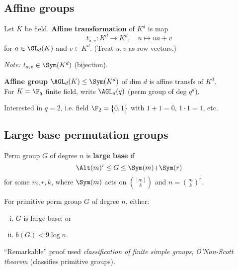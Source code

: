 \subsection{Affine groups}

\begin{slide}
    \begin{definition}
        \vspace{0pt}
        Let $K$ be field. \textbf{Affine transformation} of $K^d$ is map
        $$t_{a,v} : K^d \to K^d, \quad u \mapsto ua + v$$
        for $a \in \GL_d(K)$ and $v \in K^d$. (Treat $u,v$ as row vectors.)
    \end{definition} \pause

    \textit{Note:} $t_{a,v} \in \Sym(K^d)$ (bijection). \pause

    \begin{definition}
        \vspace{0pt}
        \textbf{Affine group} $\AGL_d(K) \leq \Sym(K^d)$ of dim $d$ is affine transfs of $K^d$. \\
        For $K = \F_q$ finite field, write $\AGL_d(q)$ (perm group of deg $q^d$).
    \end{definition} \pause

    Interested in $q = 2$, i.e. field $\F_2 = \{0,1\}$ with $1 + 1 = 0$, $1 \cdot 1 = 1$, etc.
\end{slide}

\subsection{Large base permutation groups}

\begin{slide}
    \begin{definition}
        \vspace{0pt}
        Perm group $G$ of degree $n$ is \textbf{large base} if
        $$\Alt(m)^r \unlhd G \leq \Sym(m) \wr \Sym(r)$$
        for some $m,r,k$, where $\Sym(m)$ acts on $\binom{[m]}{k}$ and $n = \binom{m}{k}^r$.
    \end{definition} \pause

    \begin{theorem}[Liebeck, 1984]
        \vspace{0pt}
        For primitive perm group $G$ of degree $n$, either:
        \begin{enumerate}[(i)]
            \item $G$ is large base; or
            \item $b(G) < 9\log n$.
        \end{enumerate}
    \end{theorem} \pause

    ``Remarkable'' proof used \textit{classification of finite simple groups}, \textit{O'Nan-Scott theorem} (classifies primitive groups).
\end{slide}

